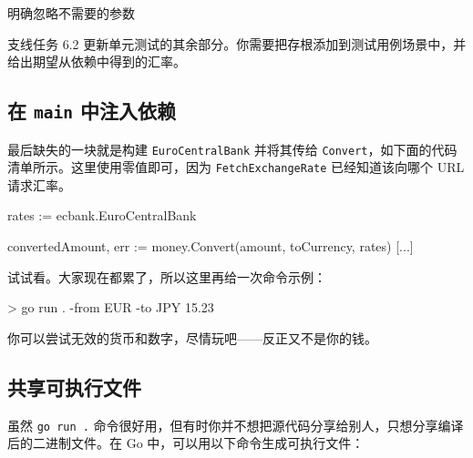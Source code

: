 
\begin{codeannotations}
\item 明确忽略不需要的参数
\end{codeannotations}

\begin{infobox}{支线任务 6.2}
更新单元测试的其余部分。你需要把存根添加到测试用例场景中，并给出期望从依赖中得到的汇率。
\end{infobox}

\subsection{在 \texttt{main} 中注入依赖}

最后缺失的一块就是构建 \texttt{EuroCentralBank} 并将其传给 \texttt{Convert}，如下面的代码清单所示。这里使用零值即可，因为 \texttt{FetchExchangeRate} 已经知道该向哪个 URL 请求汇率。

\begin{gocode}[title={代码清单 6.53 \texttt{main.go}：使用换算汇率}]
[...]
rates := ecbank.EuroCentralBank{}

convertedAmount, err := money.Convert(amount, toCurrency, rates)
[...]
\end{gocode}

试试看。大家现在都累了，所以这里再给一次命令示例：

\begin{shellcode}[]
> go run . -from EUR -to JPY 15.23
\end{shellcode}

你可以尝试无效的货币和数字，尽情玩吧——反正又不是你的钱。

\subsection{共享可执行文件}

虽然 \texttt{go run .} 命令很好用，但有时你并不想把源代码分享给别人，只想分享编译后的二进制文件。在 Go 中，可以用以下命令生成可执行文件：

